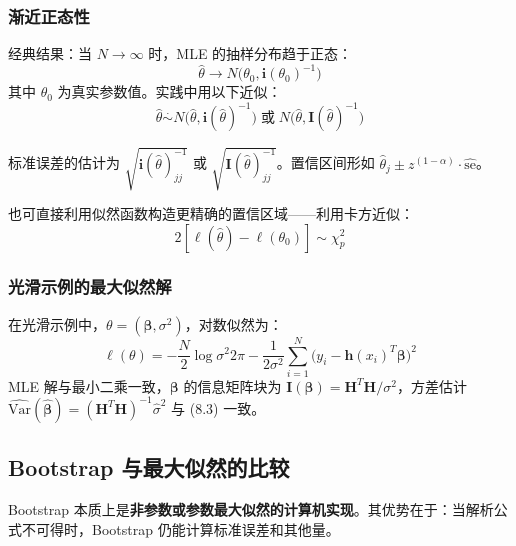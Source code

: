 \subsubsection{渐近正态性}

经典结果：当 $N \to \infty$ 时，MLE 的抽样分布趋于正态：
\begin{equation}\label{eq:asym_normal}
    \hat{\theta} \to N\bigl(\theta_0, \mathbf{i}(\theta_0)^{-1}\bigr)
\end{equation}
其中 $\theta_0$ 为真实参数值。实践中用以下近似：
\begin{equation}\label{eq:MLE_approx}
    \hat{\theta} \stackrel{\cdot}{\sim} N\bigl(\hat{\theta}, \mathbf{i}(\hat{\theta})^{-1}\bigr) \;\text{或}\; N\bigl(\hat{\theta}, \mathbf{I}(\hat{\theta})^{-1}\bigr)
\end{equation}

标准误差的估计为 $\sqrt{\mathbf{i}(\hat{\theta})^{-1}_{jj}}$ 或 $\sqrt{\mathbf{I}(\hat{\theta})^{-1}_{jj}}$。置信区间形如 $\hat{\theta}_j \pm z^{(1-\alpha)}\cdot\widehat{\mathrm{se}}$。

也可直接利用似然函数构造更精确的置信区域——利用卡方近似：
\begin{equation}\label{eq:chisq}
    2[\ell(\hat{\theta}) - \ell(\theta_0)] \sim \chi^2_p
\end{equation}

\subsubsection{光滑示例的最大似然解}

在光滑示例中，$\theta = (\bm{\beta}, \sigma^2)$，对数似然为：
\begin{equation}\label{eq:8_20}
    \ell(\theta) = -\frac{N}{2}\log\sigma^2 2\pi - \frac{1}{2\sigma^2}\sum_{i=1}^{N}\bigl(y_i - \mathbf{h}(x_i)^T\bm{\beta}\bigr)^2
\end{equation}
MLE 解与最小二乘一致，$\bm{\beta}$ 的信息矩阵块为 $\mathbf{I}(\bm{\beta}) = \mathbf{H}^T\mathbf{H}/\sigma^2$，方差估计 $\widehat{\mathrm{Var}}(\hat{\bm{\beta}}) = (\mathbf{H}^T\mathbf{H})^{-1}\hat{\sigma}^2$ 与 (8.3) 一致。

\subsection{Bootstrap 与最大似然的比较}

Bootstrap 本质上是\textbf{非参数或参数最大似然的计算机实现}。其优势在于：当解析公式不可得时，Bootstrap 仍能计算标准误差和其他量。

